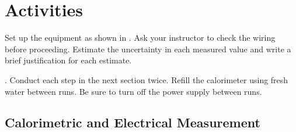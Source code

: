 \section{Activities}
Set up the equipment as shown in .  Ask your instructor to check the wiring before proceeding.  Estimate the uncertainty in each measured value and write a brief justification for each estimate. 

.  Conduct each step in the next section twice.  Refill the calorimeter using fresh water between runs. Be sure to turn off the power supply between runs.

\subsection{Calorimetric and Electrical Measurement}

